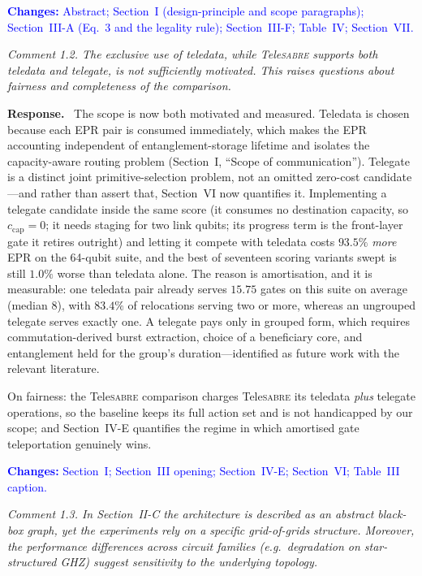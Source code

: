 \documentclass[11pt]{article}
\newcommand{\TeleSABRE}{Tele\textsc{sabre}}
\newenvironment{comment}{\medskip\noindent\itshape}{\par}
\newcommand{\response}{\smallskip\noindent\textbf{Response.}\ }
\newcommand{\where}[1]{\textcolor{blue}{\textbf{Changes:} #1}}
\begin{document}
\where{Abstract; Section~I (design-principle and scope paragraphs);
Section~III-A (Eq.~3 and the legality rule); Section~III-F; Table~IV;
Section~VII.}

\begin{comment}
Comment 1.2. The exclusive use of teledata, while \TeleSABRE{} supports both
teledata and telegate, is not sufficiently motivated. This raises questions
about fairness and completeness of the comparison.
\end{comment}

\response
The scope is now both motivated and measured. Teledata is chosen because each
EPR pair is consumed immediately, which makes the EPR accounting independent
of entanglement-storage lifetime and isolates the capacity-aware routing
problem (Section~I, ``Scope of communication''). Telegate is a distinct joint
primitive-selection problem, not an omitted zero-cost candidate---and rather
than assert that, Section~VI now quantifies it. Implementing a telegate
candidate inside the same score (it consumes no destination capacity, so
$c_{\mathrm{cap}}=0$; it needs staging for two link qubits; its progress term
is the front-layer gate it retires outright) and letting it compete with
teledata costs $93.5\%$ \emph{more} EPR on the 64-qubit suite, and the best of
seventeen scoring variants swept is still $1.0\%$ worse than teledata alone.
The reason is amortisation, and it is measurable: one teledata pair already
serves $15.75$ gates on this suite on average (median $8$), with $83.4\%$ of
relocations serving two or more, whereas an ungrouped telegate serves exactly
one. A telegate pays
only in grouped form, which requires commutation-derived burst extraction,
choice of a beneficiary core, and entanglement held for the group's
duration---identified as future work with the relevant literature.

On fairness: the \TeleSABRE{} comparison charges \TeleSABRE{} its teledata
\emph{plus} telegate operations, so the baseline keeps its full action set and
is not handicapped by our scope; and Section~IV-E quantifies the regime in
which amortised gate teleportation genuinely wins.

\where{Section~I; Section~III opening; Section~IV-E; Section~VI; Table~III
caption.}

\begin{comment}
Comment 1.3. In Section~II-C the architecture is described as an abstract
black-box graph, yet the experiments rely on a specific grid-of-grids
structure. Moreover, the performance differences across circuit families
(e.g.\ degradation on star-structured GHZ) suggest sensitivity to the
underlying topology.
\end{comment}
\end{document}
